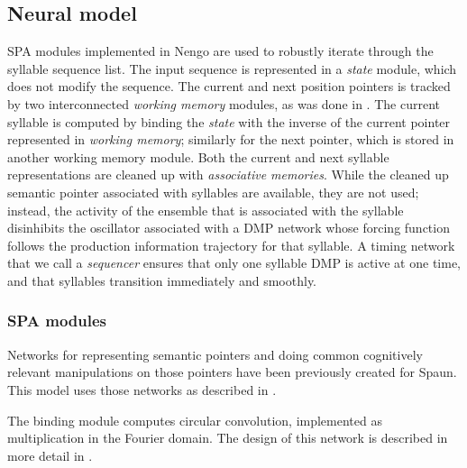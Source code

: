 \subsection{Neural model}
\label{sec:impl-prod-neuralmodel}


SPA modules implemented in Nengo are used
to robustly iterate through
the syllable sequence list.
The input sequence is represented
in a \textit{state} module,
which does not modify the sequence.
The current and next position pointers
is tracked by two interconnected
\textit{working memory} modules,
as was done in \cite{eliasmith2012}.
The current syllable is computed
by binding the \textit{state}
with the inverse of the
current pointer represented
in \textit{working memory};
similarly for the next pointer,
which is stored in another
working memory module.
Both the current and next syllable
representations are cleaned up with
\textit{associative memories}.
While the cleaned up semantic pointer
associated with syllables are available,
they are not used;
instead, the activity of the ensemble
that is associated with the syllable
disinhibits the oscillator
associated with a DMP network
whose forcing function
follows the production information trajectory
for that syllable.
A timing network that we call
a \textit{sequencer} ensures
that only one syllable DMP
is active at one time,
and that syllables transition
immediately and smoothly.

\subsubsection{SPA modules}

Networks for representing semantic pointers
and doing common cognitively relevant
manipulations on those pointers
have been previously created
for Spaun.
This model uses those networks
as described in \cite{eliasmith2013}.

The binding module computes
circular convolution,
implemented as multiplication
in the Fourier domain.
The design of this network
is described in more detail in
\cite{choo2010}.

